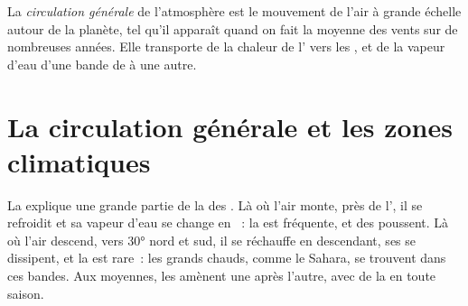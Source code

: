 \begin{definition}\label{def:g8:winds-global-circulation:circulation}
La \emph{circulation générale} de
l'atmosphère est le mouvement de l'air à grande échelle autour de la
planète, tel qu'il apparaît quand on fait la moyenne des vents sur de
nombreuses années. Elle transporte de la chaleur de l' vers les
, et de la vapeur d'eau d'une bande de  à une autre.
\end{definition}

\section{La circulation générale et les zones climatiques}

La  explique une grande partie de la  des
. Là où l'air monte, près de l', il se refroidit et sa
vapeur d'eau se change en ~: la  est fréquente, et des  poussent. Là où l'air descend, vers \ang{30} nord et
sud, il se réchauffe en descendant, ses  se dissipent, et la 
est rare~: les grands  chauds, comme le Sahara, se trouvent dans
ces bandes. Aux  moyennes, les  amènent une 
après l'autre, avec de la  en toute saison.

